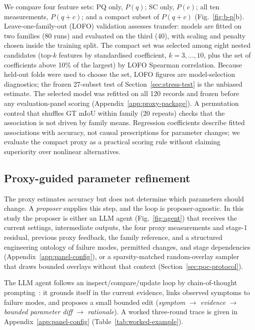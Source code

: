 \documentclass[a4paper,fleqn]{cas-dc}
\begin{document}
We compare four feature sets: PQ only, $P(q)$; SC only, $P(c)$; all ten measurements, $P(q{+}c)$; and a compact subset of $P(q{+}c)$ (Fig.~\ref{fig:b-p}b). Leave-one-family-out (LOFO) validation assesses transfer: models are fitted on two families (80 runs) and evaluated on the third (40), with scaling and penalty chosen inside the training split. The compact set was selected among eight nested candidates (top-$k$ features by standardised coefficient, $k=3,\ldots,10$, plus the set of coefficients above 10\% of the largest) by LOFO Spearman correlation. Because held-out folds were used to choose the set, LOFO figures are model-selection diagnostics; the frozen 27-subset test of Section~\ref{sec:stress-test} is the unbiased estimate. The selected model was refitted on all 120 records and frozen before any evaluation-panel scoring (Appendix~\ref{app:proxy-package}). A permutation control that shuffles GT mIoU within family (20 repeats) checks that the association is not driven by family means. Regression coefficients describe fitted associations with accuracy, not causal prescriptions for parameter changes; we evaluate the compact proxy as a practical scoring rule without claiming superiority over nonlinear alternatives.

\subsection{Proxy-guided parameter refinement}
\label{sec:agent-design}

The proxy estimates accuracy but does not determine which parameters should change. A \emph{proposer} supplies this step, and the loop is proposer-agnostic. In this study the proposer is either an LLM agent (Fig.~\ref{fig:agent}) that receives the current settings, intermediate outputs, the four proxy measurements and stage-1 residual, previous proxy feedback, the family reference, and a structured engineering ontology of failure modes, permitted changes, and stage dependencies (Appendix~\ref{app:panel-config}), or a sparsity-matched random-overlay sampler that draws bounded overlays without that context (Section~\ref{sec:poc-protocol}).

The LLM agent follows an inspect/compare/update loop by chain-of-thought prompting~\cite{wei2023cot,yao2023react}: it grounds itself in the current evidence, links observed symptoms to failure modes, and proposes a small bounded edit (\emph{symptom} $\rightarrow$ \emph{evidence} $\rightarrow$ \emph{bounded parameter diff} $\rightarrow$ \emph{rationale}). A worked three-round trace is given in Appendix~\ref{app:panel-config} (Table~\ref{tab:worked-example}).
\end{document}
